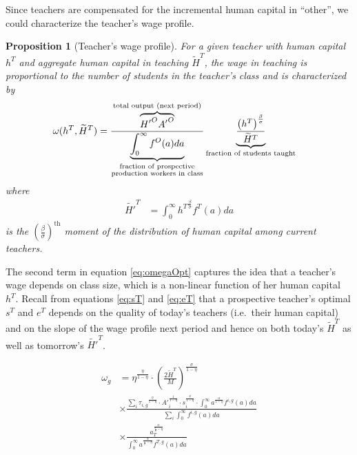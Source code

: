 \documentclass[onehalfspacing,11pt]{article}
\newtheorem{prp}{Proposition}
\begin{document}
Since teachers are compensated for the incremental human capital in ``other'', we could characterize the teacher's wage profile.
\begin{prp}[Teacher's wage profile] For a given teacher with human capital $h^T$ and aggregate human capital in teaching $\widetilde{H}^T$, the wage in teaching is proportional to the \textit{number of students} in the teacher's class and is characterized by
\begin{align}
\label{eq:omegaOpt}
   \omega(h^T,\widetilde{H}^T) & =  \frac{\overbrace{{H'}^O {A'}^O}^{\textrm{total output (next period)}}}{\underbrace{\int_0^\infty f^O(a) da}_{\begin{subarray}{c}\textrm{fraction of prospective} \\ \textrm{production workers in class}\end{subarray}}} \underbrace{\frac{\left( h^T \right)^{\frac{\beta}{\sigma}}}{{\widetilde{H}^T}}}_{\textrm{fraction of students taught}}
\end{align}
where
\begin{align*}
\label{}
  \widetilde{H'}^{T} & = \int_0^\infty {h^T}^{\frac{\beta}{\sigma}} f^T(a) da
\end{align*}
is the ${\left( \tfrac{\beta}{\sigma} \right)}^{\textrm{th}}$ moment of the distribution of human capital among current teachers.
\end{prp}

The second term in equation \eqref{eq:omegaOpt} captures the idea that a teacher's wage depends on class size, which is a non-linear function of her human capital $h^T$. Recall from equations \eqref{eq:sT} and \eqref{eq:eT} that a prospective teacher's optimal $s^T$ and $e^T$ depends on the quality of today's teachers (i.e.~their human capital) and on the slope of the wage profile next period and hence on both today's $ \widetilde{H}^{T}$ as well as tomorrow's $\widetilde{H'}^{T}$.

\begin{align}
\omega_g & = \eta^{\frac{\eta}{1-\eta}}\cdot \left(\tfrac{2\widetilde{H}^T}{M}\right)^{\frac{\sigma}{1-\eta}} \nonumber\\
& \times \frac{\sum_i {\tau_{i,g}}^{\frac{\eta}{1-\eta}} \cdot {A'}_i^{\frac{1}{1-\eta}} \cdot s_i^{\frac{\phi}{1-\eta}} \cdot \int_0^\infty a^{\frac{\alpha}{1-\eta}} f^{i,g}(a)da }{\sum_i \int_0^\infty f^{i,g}(a)da} \nonumber\\
& \times \frac{a_T^{\frac{\alpha}{\frac{\sigma}{\beta}-\eta}}}{\int_0^\infty a^{\frac{\alpha}{\frac{\sigma}{\beta}-\eta}} f^{T,g}(a)da}
\end{align}
\end{document}
